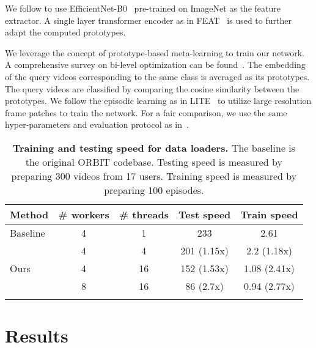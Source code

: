  We follow \cite{bronskill2021memory} to use EfficientNet-B0~\cite{tan2019efficientnet} pre-trained on ImageNet \cite{deng2009imagenet} as the feature extractor. A single layer transformer encoder as in FEAT~\cite{ye2020few} is used to further adapt the computed prototypes. 

 We leverage the concept of prototype-based meta-learning to train our network. A comprehensive survey on bi-level optimization can be found~\cite{chen2022gradient}. The embedding of the query videos corresponding to the same class is averaged as its prototypes. The query videos are classified by comparing the cosine similarity between the prototypes. We follow the episodic learning as in LITE~\cite{bronskill2021memory} to utilize large resolution frame patches to train the network. For a fair comparison, we use the same hyper-parameters and evaluation protocol as in~\cite{bronskill2021memory,massiceti2021orbit}. 


\begin{table}
\small
\centering
\setlength{\tabcolsep}{5pt}
\caption{\textbf{Training and testing speed for data loaders.} The baseline is the original ORBIT codebase. Testing speed is measured by preparing 300 videos from 17 users. Training speed is measured by preparing 100 episodes.} 
\begin{tabular}{lcccc}
\Xhline{1pt}
Method & \# workers & \# threads & Test speed & Train speed \\ 
\hline
Baseline & 4 & 1 & 233 & 2.61 \\
\Xhline{1pt}
 & 4 & 4 & 201 (1.15x) & 2.2 (1.18x) \\
Ours & 4 & 16 & 152 (1.53x) & 1.08 (2.41x) \\
 & 8 & 16 & 86 (2.7x) & 0.94 (2.77x) \\
 \Xhline{1pt}
\end{tabular}
\label{performance}
\end{table}

\section{Results}


